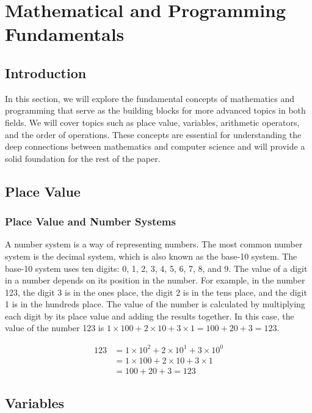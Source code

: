 \chapter{Mathematical and Programming Fundamentals}\label{ch:mathematical-foundations}

\section{Introduction}

In this section, we will explore the fundamental concepts of mathematics and programming that serve as the building blocks for more advanced topics in both fields. We will cover topics such as place value, variables, arithmetic operators, and the order of operations. These concepts are essential for understanding the deep connections between mathematics and computer science and will provide a solid foundation for the rest of the paper.

\section{Place Value}

\subsection{Place Value and Number Systems}

A number system is a way of representing numbers. The most common number system is the decimal system, which is also known as the base-10 system. The base-10 system uses ten digits: 0, 1, 2, 3, 4, 5, 6, 7, 8, and 9. The value of a digit in a number depends on its position in the number. For example, in the number 123, the digit 3 is in the ones place, the digit 2 is in the tens place, and the digit 1 is in the hundreds place. The value of the number is calculated by multiplying each digit by its place value and adding the results together. In this case, the value of the number 123 is $1 \times 100 + 2 \times 10 + 3 \times 1 = 100 + 20 + 3 = 123$.

\begin{align*}
    123 &= 1 \times 10^2 + 2 \times 10^1 + 3 \times 10^0 \\
        &= 1 \times 100 + 2 \times 10 + 3 \times 1 \\
        &= 100 + 20 + 3 = 123
\end{align*}

\section{Variables}

